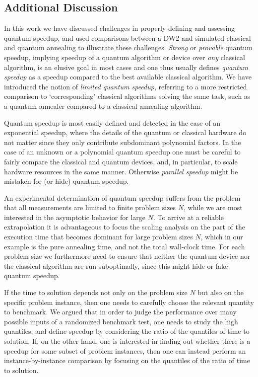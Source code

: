\subsection{Additional Discussion}

In this work we have discussed challenges in properly defining and assessing quantum speedup, and used comparisons between a DW2 and simulated classical and quantum annealing to illustrate these challenges. \emph{Strong} or \emph{provable} quantum speedup, implying speedup of a quantum algorithm or device over \emph{any} classical algorithm, is an elusive goal in most cases and one thus usually defines \emph{quantum speedup} as a speedup compared to the best available classical algorithm. We have introduced the notion of \emph{limited quantum speedup}, referring to a more restricted comparison to `corresponding' classical algorithms solving the same task, such as a quantum annealer compared to a classical annealing algorithm.

Quantum speedup is most easily defined and detected in the case of an exponential speedup, where the details of the quantum or classical hardware do not matter since they only contribute subdominant polynomial factors. In the case of an unknown or a polynomial quantum speedup one must be careful to fairly compare the classical and quantum devices, and, in particular, to scale hardware resources in the same manner. Otherwise \emph{parallel speedup} might be mistaken for (or hide) quantum speedup.

An experimental determination of quantum speedup suffers from the problem that all measurements are limited to finite problem sizes $N$, while we are most interested in the asymptotic behavior for large $N$. To arrive at a reliable extrapolation it is advantageous to focus the scaling analysis on the part of the execution time that becomes dominant for large problem sizes $N$, which in our example is the pure annealing time, and not the total wall-clock time. For each problem size we furthermore need to ensure that neither the quantum device nor the classical algorithm are run suboptimally, since this might hide or fake quantum speedup.

If the time to solution depends not only on the problem size $N$ but also on the specific problem instance, then one needs to carefully choose the relevant quantity to benchmark. We argued that in order to judge the performance over many possible inputs of a randomized benchmark test, one needs to study the high quantiles, and define speedup by considering the ratio of the quantiles of time to solution. If, on the other hand, one is interested in finding out whether there is a speedup for some subset of problem instances, then one can instead perform an instance-by-instance comparison by focusing on the quantiles of the ratio of time to solution.

